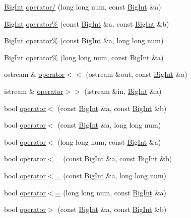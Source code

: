\begin{DoxyCompactItemize}
\item 
\hyperlink{class_big_int}{Big\+Int} \hyperlink{class_big_int_abd3776fc592b78cb26812dfebf9b0a87}{operator/} (long long num, const \hyperlink{class_big_int}{Big\+Int} \&a)
\item 
\hyperlink{class_big_int}{Big\+Int} \hyperlink{class_big_int_a463be2d085983a0ba8a0cc5be32c5f96}{operator\%} (const \hyperlink{class_big_int}{Big\+Int} \&a, const \hyperlink{class_big_int}{Big\+Int} \&b)
\item 
\hyperlink{class_big_int}{Big\+Int} \hyperlink{class_big_int_a628feeac6b244f8107518fb8ba6f379c}{operator\%} (const \hyperlink{class_big_int}{Big\+Int} \&a, long long num)
\item 
\hyperlink{class_big_int}{Big\+Int} \hyperlink{class_big_int_a071c38790554cbfc14e58e4ebd56c702}{operator\%} (long long num, const \hyperlink{class_big_int}{Big\+Int} \&a)
\item 
ostream \& \hyperlink{class_big_int_acba0569c5cb9dc9af2d27f65ce48daf8}{operator$<$$<$} (ostream \&out, const \hyperlink{class_big_int}{Big\+Int} \&a)
\item 
istream \& \hyperlink{class_big_int_abe387e8cc08c8919c29e7573a74559f2}{operator$>$$>$} (istream \&in, \hyperlink{class_big_int}{Big\+Int} \&a)
\item 
bool \hyperlink{class_big_int_af6b14de2bba24c0478b7efa932190d01}{operator$<$} (const \hyperlink{class_big_int}{Big\+Int} \&a, const \hyperlink{class_big_int}{Big\+Int} \&b)
\item 
bool \hyperlink{class_big_int_a5f4e22a269f15452a8f4a859f3f59429}{operator$<$} (const \hyperlink{class_big_int}{Big\+Int} \&a, long long num)
\item 
bool \hyperlink{class_big_int_a603f5f6ed78dfb744b36838ef8036367}{operator$<$} (long long num, const \hyperlink{class_big_int}{Big\+Int} \&a)
\item 
bool \hyperlink{class_big_int_ad57ab1ea41721d4e2f6c6450db9ebbba}{operator$<$=} (const \hyperlink{class_big_int}{Big\+Int} \&a, const \hyperlink{class_big_int}{Big\+Int} \&b)
\item 
bool \hyperlink{class_big_int_a52513cceb8fd5c4ff3920081c550e825}{operator$<$=} (const \hyperlink{class_big_int}{Big\+Int} \&a, long long num)
\item 
bool \hyperlink{class_big_int_ab26e0eb90a3cfc88a946898d98d8eb9c}{operator$<$=} (long long num, const \hyperlink{class_big_int}{Big\+Int} \&a)
\item 
bool \hyperlink{class_big_int_a983eaea8ba326a099f99bce4c549e88b}{operator$>$} (const \hyperlink{class_big_int}{Big\+Int} \&a, const \hyperlink{class_big_int}{Big\+Int} \&b)

\end{DoxyCompactItemize}
